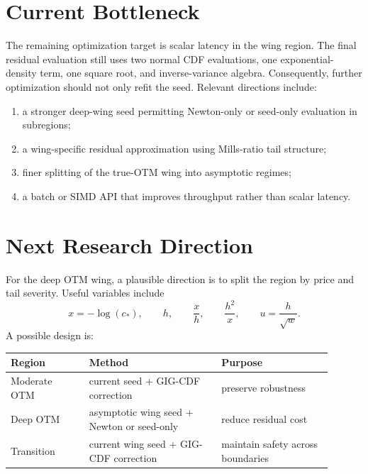 \documentclass[11pt]{article}
\begin{document}
	\section{Current Bottleneck}
	
	The remaining optimization target is scalar latency in the wing region. The final residual evaluation still uses two normal CDF evaluations, one exponential-density term, one square root, and inverse-variance algebra. Consequently, further optimization should not only refit the seed. Relevant directions include:
	\begin{enumerate}[label=(\arabic*)]
		\item a stronger deep-wing seed permitting Newton-only or seed-only evaluation in subregions;
		\item a wing-specific residual approximation using Mills-ratio tail structure;
		\item finer splitting of the true-OTM wing into asymptotic regimes;
		\item a batch or SIMD API that improves throughput rather than scalar latency.
	\end{enumerate}
	
	\section{Next Research Direction}
	
	For the deep OTM wing, a plausible direction is to split the region by price and tail severity. Useful variables include
	\begin{equation}
		x=-\log(c_*), \qquad h, \qquad \frac{x}{h}, \qquad \frac{h^2}{x}, \qquad u=\frac{h}{\sqrt{w}}.
	\end{equation}
	A possible design is:
	\begin{center}
		\begin{tabular}{p{0.22\linewidth}p{0.37\linewidth}p{0.31\linewidth}}
			\toprule
			Region & Method & Purpose \\
			\midrule
			Moderate OTM & current seed + GIG-CDF correction & preserve robustness \\
			Deep OTM & asymptotic wing seed + Newton or seed-only & reduce residual cost \\
			Transition & current wing seed + GIG-CDF correction & maintain safety across boundaries \\
			\bottomrule
		\end{tabular}
	\end{center}
	
\end{document}
